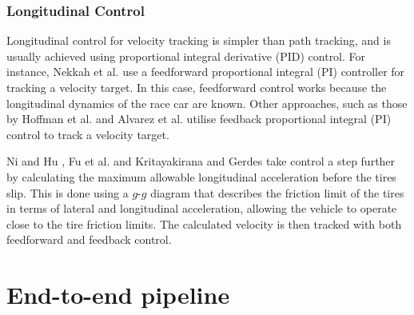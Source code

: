 \subsubsection*{Longitudinal Control}
Longitudinal control for velocity tracking is simpler than path tracking, and is usually achieved using proportional integral derivative (PID) control. 
For instance, Nekkah et al. \cite{Nekkah2020} use a feedforward proportional integral (PI) controller for tracking a velocity target. 
In this case, feedforward control works because the longitudinal dynamics of the race car are known.
Other approaches, such as those by Hoffman et al. \cite{Hoffmann2007} and Alvarez et al. \cite{alvarez2022} utilise feedback proportional integral (PI) control to track a velocity target.

Ni and Hu \cite{Ni2017}, Fu et al. \cite{Fu2016} and Kritayakirana and Gerdes \cite{Kritayakirana2012} take control a step further by calculating the maximum allowable longitudinal acceleration before the tires slip.
This is done using a $g$-$g$ diagram that describes the friction limit of the tires in terms of lateral and longitudinal acceleration, 
allowing the vehicle to operate close to the tire friction limits.
The calculated velocity is then tracked with both feedforward and feedback control.




\section{End-to-end pipeline}
\label{sec:end_to_end}

